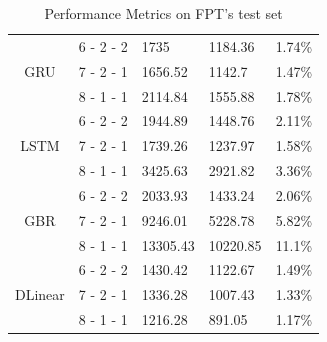 \documentclass{ieeeojies}
\begin{document}
\begin{table}[H]
\begin{tabular}{|c|c|p{1cm}|p{1cm}|p{1cm}|}
        \hline
        \multirow{3}{*}{GRU}
                       & 6 - 2 - 2               & 1735          & 1184.36      & 1.74\%        \\
        \cline{2-5}
                       & 7 - 2 - 1               & 1656.52       & 1142.7       & 1.47\%        \\
        \cline{2-5}
                       & 8 - 1 - 1               & 2114.84       & 1555.88      & 1.78\%        \\
        \hline
        \multirow{3}{*}{LSTM}
                       & 6 - 2 - 2               & 1944.89       & 1448.76      & 2.11\%        \\
        \cline{2-5}
                       & 7 - 2 - 1               & 1739.26       & 1237.97      & 1.58\%        \\
        \cline{2-5}
                       & 8 - 1 - 1               & 3425.63       & 2921.82      & 3.36\%        \\
        \hline
        \multirow{3}{*}{GBR}
                       & 6 - 2 - 2               & 2033.93       & 1433.24      & 2.06\%        \\
        \cline{2-5}
                       & 7 - 2 - 1               & 9246.01       & 5228.78      & 5.82\%        \\
        \cline{2-5}
                       & 8 - 1 - 1               & 13305.43      & 10220.85     & 11.1\%        \\
        \hline
        \multirow{3}{*}{DLinear}
                       & 6 - 2 - 2               & 1430.42       & 1122.67      & 1.49\%        \\
        \cline{2-5}
                       & 7 - 2 - 1               & 1336.28       & 1007.43      & 1.33\%        \\
        \cline{2-5}
                       & 8 - 1 - 1               & 1216.28       & 891.05       & 1.17\%        \\
        \hline
    \end{tabular}
    \caption{Performance Metrics on FPT's test set}
    \label{tab:performance_metrics_fpt}
\end{table}
\end{document}
